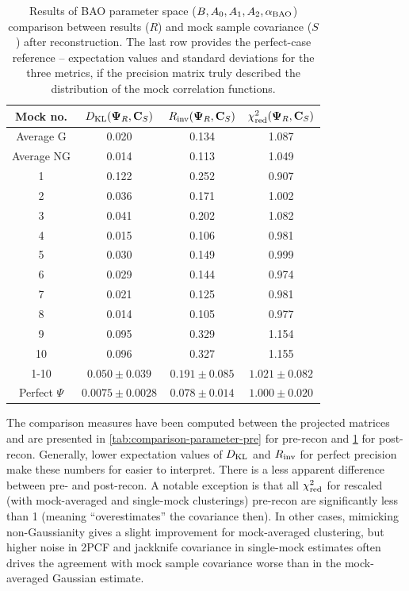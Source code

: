 \begin{table}
\centering
\begin{tabular}{|c|c|c|c|}
\hline
Mock no. & $D_{\rm KL} {\left( {\bf \Psi}_R, {\bf C}_S \right)}$ & $R_{\rm inv} {\left( {\bf \Psi}_R, {\bf C}_S \right)}$ & $\chi^2_{\rm red} {\left( {\bf \Psi}_R, {\bf C}_S \right)}$ \\
\hline
Average G & 0.020 & 0.134 & 1.087 \\
Average NG & 0.014 & 0.113 & 1.049 \\
\hline
1 & 0.122 & 0.252 & 0.907 \\
2 & 0.036 & 0.171 & 1.002 \\
3 & 0.041 & 0.202 & 1.082 \\
4 & 0.015 & 0.106 & 0.981 \\
5 & 0.030 & 0.149 & 0.999 \\
6 & 0.029 & 0.144 & 0.974 \\
7 & 0.021 & 0.125 & 0.981 \\
8 & 0.014 & 0.105 & 0.977 \\
9 & 0.095 & 0.329 & 1.154 \\
10 & 0.096 & 0.327 & 1.155 \\
\hline
1-10 & $0.050 \pm 0.039$ & $0.191 \pm 0.085$ & $1.021 \pm 0.082$ \\
\hline
Perfect $\Psi$ & $0.0075 \pm 0.0028$ & $0.078 \pm 0.014$ & $1.000 \pm 0.020$ \\
\hline
\end{tabular}
\caption[Parameter-space (for BAO model) comparison between \rascalc{} and sample covariance for \desimtwo{} mocks after reconstruction]{Results of BAO parameter space ($B, A_0, A_1, A_2, \alpha_{\rm BAO}$) comparison between \rascalc{} results ($R$) and mock sample covariance ($S$) after reconstruction.
The last row provides the perfect-case reference -- expectation values and standard deviations for the three metrics, if the \rascalc{} precision matrix truly described the distribution of the mock correlation functions.
}
\label{tab:comparison-parameter-post}
\end{table}

The comparison measures have been computed between the projected matrices and are presented in \cref{tab:comparison-parameter-pre} for pre-recon and \cref{tab:comparison-parameter-post} for post-recon.
Generally, lower expectation values of $D_{\rm KL}$ and $R_{\rm inv}$ for perfect precision make these numbers for \rascalc{} easier to interpret.
There is a less apparent difference between pre- and post-recon.
A notable exception is that all $\chi^2_{\rm red}$ for rescaled (with mock-averaged and single-mock clusterings) pre-recon are significantly less than 1 (meaning \rascalc{} ``overestimates'' the covariance then).
In other cases, mimicking non-Gaussianity gives a slight improvement for mock-averaged clustering, but higher noise in 2PCF and jackknife covariance in single-mock estimates often drives the agreement with mock sample covariance worse than in the mock-averaged Gaussian estimate.

